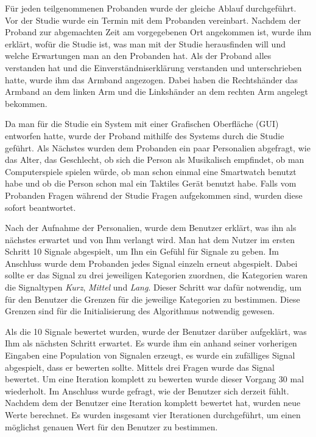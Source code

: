 F{\"u}r jeden teilgenommenen Probanden wurde der gleiche Ablauf durchgef{\"u}hrt. 
Vor der Studie wurde ein Termin mit dem Probanden vereinbart. 
Nachdem der Proband zur abgemachten Zeit am vorgegebenen Ort angekommen ist, wurde ihm erkl{\"a}rt, wof{\"u}r die Studie ist, was man mit der Studie herausfinden will und welche Erwartungen man an den Probanden hat. 
Als der Proband alles verstanden hat und die Einverst{\"a}ndniserkl{\"a}rung verstanden und unterschrieben hatte, wurde ihm das Armband angezogen. 
Dabei haben die Rechtsh{\"a}nder das Armband an dem linken Arm und die Linksh{\"a}nder an dem rechten Arm angelegt bekommen.

Da man f{\"u}r die Studie ein System mit einer Grafischen Oberfl{\"a}che (GUI) entworfen hatte, wurde der Proband mithilfe des Systems durch die Studie gef{\"u}hrt.
Als N{\"a}chstes wurden dem Probanden ein paar Personalien abgefragt, wie das Alter, das Geschlecht, ob sich die Person als Musikalisch empfindet, ob man Computerspiele spielen w{\"u}rde, ob man schon einmal eine Smartwatch benutzt habe und ob die Person schon mal ein Taktiles Ger{\"a}t benutzt habe. 
Falls vom Probanden Fragen w{\"a}hrend der Studie Fragen aufgekommen sind, wurden diese sofort beantwortet. 

Nach der Aufnahme der Personalien, wurde dem Benutzer erkl{\"a}rt, was ihn als n{\"a}chstes erwartet und von Ihm verlangt wird. 
Man hat dem Nutzer im ersten Schritt 10 Signale abgespielt, um Ihn ein Gef{\"u}hl f{\"u}r Signale zu geben. 
Im Anschluss wurde dem Probanden jedes Signal einzeln erneut abgespielt. 
Dabei sollte er das Signal zu drei jeweiligen Kategorien zuordnen, die Kategorien waren die Signaltypen \textit{Kurz}, \textit{Mittel} und \textit{Lang}. 
Dieser Schritt war daf{\"u}r notwendig, um f{\"u}r den Benutzer die Grenzen f{\"u}r die jeweilige Kategorien zu bestimmen. 
Diese Grenzen sind f{\"u}r die Initialisierung des Algorithmus notwendig gewesen. 

Als die 10 Signale bewertet wurden, wurde der Benutzer dar{\"u}ber aufgekl{\"a}rt, was Ihm als n{\"a}chsten Schritt erwartet. 
Es wurde ihm ein anhand seiner vorherigen Eingaben eine Population von Signalen erzeugt, es wurde ein zuf{\"a}lliges Signal abgespielt, dass er bewerten sollte.
Mittels drei Fragen wurde das Signal bewertet. 
Um eine Iteration komplett zu bewerten wurde dieser Vorgang 30 mal wiederholt. 
Im Anschluss wurde gefragt, wie der Benutzer sich derzeit f{\"u}hlt. 
Nachdem dem der Benutzer eine Iteration komplett bewertet hat, wurden neue Werte berechnet.
Es wurden insgesamt vier Iterationen durchgef{\"u}hrt, um einen m{\"o}glichst genauen Wert f{\"u}r den Benutzer zu bestimmen.

